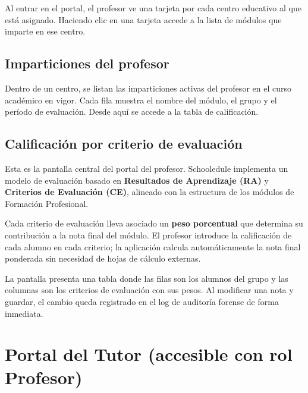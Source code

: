 \documentclass[12pt, a4paper]{report}
\begin{document}
Al entrar en el portal, el profesor ve una tarjeta por cada centro educativo al que está
asignado. Haciendo clic en una tarjeta accede a la lista de módulos que imparte en ese
centro.


\subsection{Imparticiones del profesor}

Dentro de un centro, se listan las imparticiones activas del profesor en el curso
académico en vigor. Cada fila muestra el nombre del módulo, el grupo y el período de
evaluación. Desde aquí se accede a la tabla de calificación.


\subsection{Calificación por criterio de evaluación}

Esta es la pantalla central del portal del profesor. Schooledule implementa un modelo
de evaluación basado en \textbf{Resultados de Aprendizaje (RA)} y \textbf{Criterios de
Evaluación (CE)}, alineado con la estructura de los módulos de Formación Profesional.

Cada criterio de evaluación lleva asociado un \textbf{peso porcentual} que determina su
contribución a la nota final del módulo. El profesor introduce la calificación de cada
alumno en cada criterio; la aplicación calcula automáticamente la nota final ponderada
sin necesidad de hojas de cálculo externas.

La pantalla presenta una tabla donde las filas son los alumnos del grupo y las columnas
son los criterios de evaluación con sus pesos. Al modificar una nota y guardar, el
cambio queda registrado en el log de auditoría forense de forma inmediata.


\section{Portal del Tutor (accesible con rol Profesor)}
\end{document}
